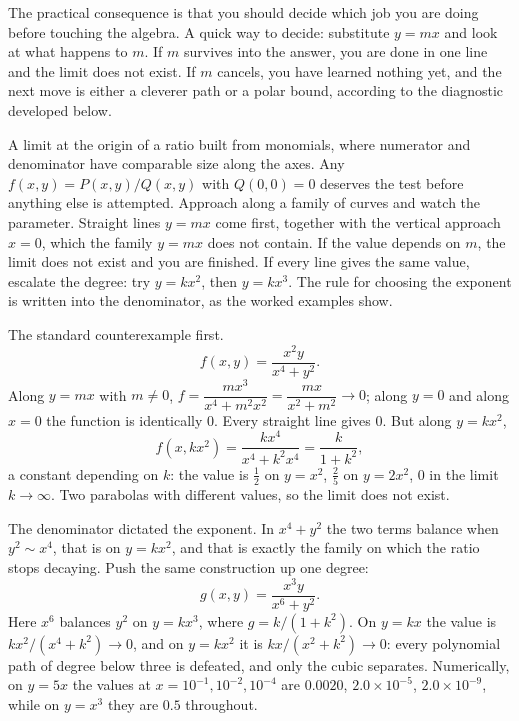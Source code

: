 The practical consequence is that you should decide which job you are doing before touching the algebra. A quick way to decide: substitute $y=mx$ and look at what happens to $m$. If $m$ survives into the answer, you are done in one line and the limit does not exist. If $m$ cancels, you have learned nothing yet, and the next move is either a cleverer path or a polar bound, according to the diagnostic developed below.

\cue A limit at the origin of a ratio built from monomials, where numerator and denominator have comparable size along the axes. Any $f(x,y)=P(x,y)/Q(x,y)$ with $Q(0,0)=0$ deserves the test before anything else is attempted.
\method Approach along a family of curves and watch the parameter. Straight lines $y=mx$ come first, together with the vertical approach $x=0$, which the family $y=mx$ does not contain. If the value depends on $m$, the limit does not exist and you are finished. If every line gives the same value, escalate the degree: try $y=kx^{2}$, then $y=kx^{3}$. The rule for choosing the exponent is written into the denominator, as the worked examples show.

\begin{worked}
The standard counterexample first.
\[f(x,y)=\frac{x^{2}y}{x^{4}+y^{2}}.\]
Along $y=mx$ with $m\neq0$, $f=\dfrac{mx^{3}}{x^{4}+m^{2}x^{2}}=\dfrac{mx}{x^{2}+m^{2}}\to0$; along $y=0$ and along $x=0$ the function is identically $0$. Every straight line gives $0$. But along $y=kx^{2}$,
\[f(x,kx^{2})=\frac{kx^{4}}{x^{4}+k^{2}x^{4}}=\frac{k}{1+k^{2}},\]
a constant depending on $k$: the value is $\tfrac12$ on $y=x^{2}$, $\tfrac25$ on $y=2x^{2}$, $0$ in the limit $k\to\infty$. Two parabolas with different values, so the limit does not exist.

The denominator dictated the exponent. In $x^{4}+y^{2}$ the two terms balance when $y^{2}\sim x^{4}$, that is on $y=kx^{2}$, and that is exactly the family on which the ratio stops decaying. Push the same construction up one degree:
\[g(x,y)=\frac{x^{3}y}{x^{6}+y^{2}}.\]
Here $x^{6}$ balances $y^{2}$ on $y=kx^{3}$, where $g=k/(1+k^{2})$. On $y=kx$ the value is $kx^{2}/(x^{4}+k^{2})\to0$, and on $y=kx^{2}$ it is $kx/(x^{2}+k^{2})\to0$: every polynomial path of degree below three is defeated, and only the cubic separates. Numerically, on $y=5x$ the values at $x=10^{-1},10^{-2},10^{-4}$ are $0.0020$, $2.0\times10^{-5}$, $2.0\times10^{-9}$, while on $y=x^{3}$ they are $0.5$ throughout.
\end{worked}

